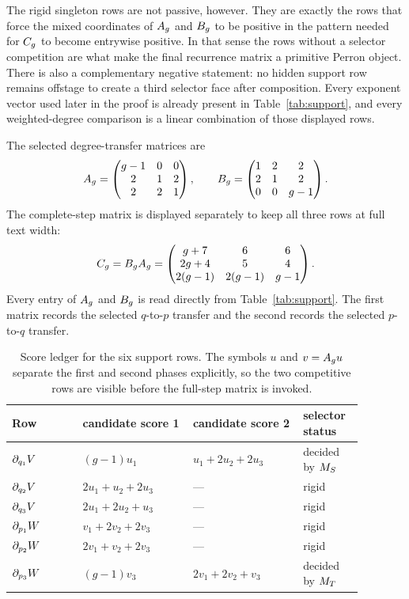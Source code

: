 \documentclass[11pt]{article}
\theoremstyle{remark}
\numberwithin{equation}{section}
\begin{document}
The rigid singleton rows are not passive, however.  They are exactly the rows
that force the mixed coordinates of \(A_g\) and \(B_g\) to be positive in the
pattern needed for \(C_g\) to become entrywise positive.  In that sense the
rows without a selector competition are what make the final recurrence matrix a
primitive Perron object.  There is also a complementary negative statement: no
hidden support row remains offstage to create a third selector face after
composition.  Every exponent vector used later in the proof is already present
in Table~\ref{tab:support}, and every weighted-degree comparison is a linear
combination of those displayed rows.

The selected degree-transfer matrices are
\[
A_g=
\begin{pmatrix}
g-1&0&0\\
2&1&2\\
2&2&1
\end{pmatrix},
\qquad
B_g=
\begin{pmatrix}
1&2&2\\
2&1&2\\
0&0&g-1
\end{pmatrix}.
\]
The complete-step matrix is displayed separately to keep all three rows at
full text width:
\[
C_g=B_gA_g=
\begin{pmatrix}
g+7&6&6\\
2g+4&5&4\\
2(g-1)&2(g-1)&g-1
\end{pmatrix}.
\]
Every entry of \(A_g\) and \(B_g\) is read directly from
Table~\ref{tab:support}.  The first matrix records the selected
\(q\)-to-\(p\) transfer and the second records the selected \(p\)-to-\(q\)
transfer.

\begin{table}[t]
\centering
\small
\begin{tabular}{p{0.18\linewidth}p{0.28\linewidth}p{0.28\linewidth}p{0.14\linewidth}}
\toprule
Row & candidate score 1 & candidate score 2 & selector status \\
\midrule
\(\partial_{q_1}V\) & \((g-1)u_1\) & \(u_1+2u_2+2u_3\) & decided by \(M_S\) \\
\(\partial_{q_2}V\) & \(2u_1+u_2+2u_3\) & --- & rigid \\
\(\partial_{q_3}V\) & \(2u_1+2u_2+u_3\) & --- & rigid \\
\(\partial_{p_1}W\) & \(v_1+2v_2+2v_3\) & --- & rigid \\
\(\partial_{p_2}W\) & \(2v_1+v_2+2v_3\) & --- & rigid \\
\(\partial_{p_3}W\) & \((g-1)v_3\) & \(2v_1+2v_2+v_3\) & decided by \(M_T\) \\
\bottomrule
\end{tabular}
\caption{Score ledger for the six support rows.  The symbols \(u\) and \(v=A_g u\) separate the first and second phases explicitly, so the two competitive rows are visible before the full-step matrix is invoked.}
\label{tab:scores}
\end{table}
\end{document}
